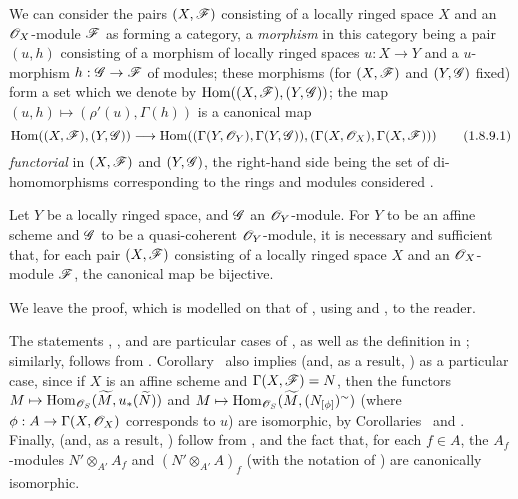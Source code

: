 \begin{env}[1.8.9]
\label{I.1.8.9}
We can consider the pairs $(X,\mathscr{F})$ consisting of a locally ringed space $X$ and an $\mathscr{O}_X$-module $\mathscr{F}$ as forming a category, a \emph{morphism} in this category being a pair $(u,h)$ consisting of a morphism of locally ringed spaces
$u:X\to Y$ and a $u$-morphism $h:\sh{G}\to\sh{F}$ of modules;
these morphisms (for $(X,\mathscr{F})$ and $(Y,\mathscr{G})$ fixed) form a set which we denote by $\operatorname{Hom}((X,\mathscr{F}),(Y,\mathscr{G}))$;
the map $(u,h)\mapsto(\rho'(u),\Gamma(h))$ is a canonical map
\[
  \label{I.1.8.9.1}
  \Hom((X,\sh{F}),(Y,\sh{G}))\to\Hom((\Gamma(Y,\sh{O}_Y),\Gamma(Y,\sh{G})),(\Gamma(X,\sh{O}_X),\Gamma(X,\sh{F})))
  \tag{1.8.9.1}
\]
\emph{functorial} in $(X,\mathscr{F})$ and $(Y,\mathscr{G})$, the right-hand side being the set of di-homomorphisms corresponding to the rings and modules considered .
\end{env}

\begin{corollary}[1.8.10]
\label{I.1.8.10}
Let $Y$ be a locally ringed space, and $\mathscr{G}$ an $\mathscr{O}_Y$-module.
For $Y$ to be an affine scheme and $\mathscr{G}$ to be a quasi-coherent $\mathscr{O}_Y$-module, it is necessary and sufficient that, for each pair $(X,\mathscr{F})$ consisting of a locally ringed space $X$ and an $\mathscr{O}_X$-module $\mathscr{F}$, the canonical map  be bijective.
\end{corollary}

We leave the proof, which is modelled on that of , using  and , to the reader.

\begin{remark}[1.8.11]
\label{I.1.8.11}
The statements , , and  are particular cases of , as well as the definition in ;
similarly,  follows from .
Corollary~ also implies  (and, as a result, ) as a particular case, since if $X$ is an affine scheme and $\Gamma(X,\mathscr{F})=N$, then the functors $M\mapsto\Hom_{\sh{O}_S}(\widetilde{M},u_*(\widetilde{N}))$ and $M\mapsto\Hom_{\sh{O}_S}(\widetilde{M},(N_{[\vphi]})^\sim)$ (where $\vphi:A\to\Gamma(X,\sh{O}_X)$ corresponds to $u$) are isomorphic, by Corollaries~ and .
Finally,  (and, as a result, ) follow from , and the fact that, for each $f\in A$, the $A_f$-modules $N'\otimes_{A'}A_f$ and $(N'\otimes_{A'}A)_f$ (with the notation of ) are canonically isomorphic.
\end{remark}


